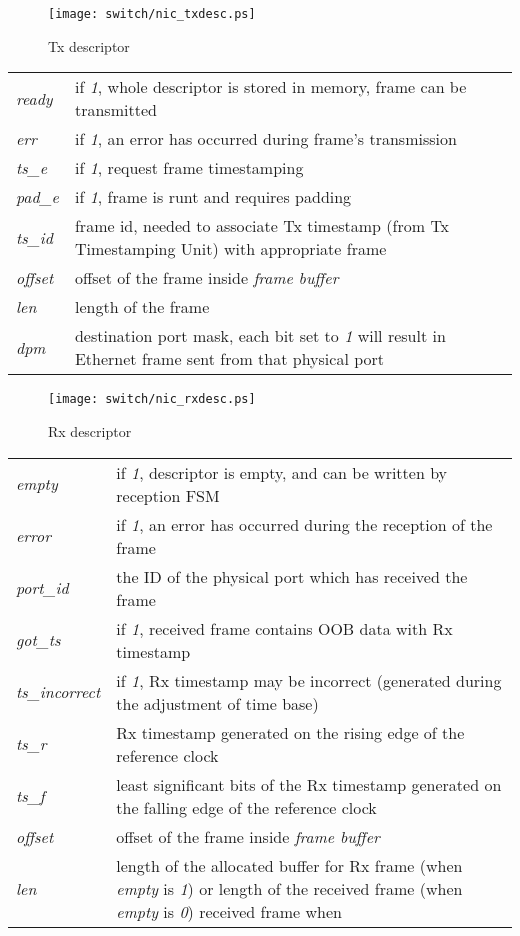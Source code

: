 \begin{figure}[ht]
  \begin{center}
    \texttt{[image: switch/nic\_txdesc.ps]}
    \caption{Tx descriptor}
    \label{fig:nic:tx_desc}
  \end{center}
\end{figure}
\newpage
\begin{tabular}{l p{12cm}}
  \emph{ready} & if \emph{1}, whole descriptor is stored in memory, frame can be
  transmitted\\
  \emph{err} & if \emph{1}, an error has occurred during frame's
    transmission\\
  \emph{ts\_e} & if \emph{1}, request frame timestamping\\
  \emph{pad\_e} & if \emph{1}, frame is runt and requires padding\\
  \emph{ts\_id} & frame id, needed to associate Tx timestamp (from Tx
    Timestamping Unit) with appropriate frame\\
  \emph{offset} & offset of the frame inside \emph{frame buffer}\\
  \emph{len} & length of the frame\\
  \emph{dpm} & destination port mask, each bit set to \emph{1} will
    result in Ethernet frame sent from that physical port\\
\end{tabular}


\begin{figure}[ht]
  \begin{center}
    \texttt{[image: switch/nic\_rxdesc.ps]}
    \caption{Rx descriptor}
    \label{fig:nic:rx_desc}
  \end{center}
\end{figure}
\begin{tabular}{l p{12cm}}
  \emph{empty} & if \emph{1}, descriptor is empty, and can be written by
  reception FSM\\
  \emph{error} & if \emph{1}, an error has occurred during the reception of the
  frame\\
  \emph{port\_id} & the ID of the physical port which has received the frame\\
  \emph{got\_ts} & if \emph{1}, received frame contains OOB data with Rx
  timestamp\\
  \emph{ts\_incorrect} & if \emph{1}, Rx timestamp may be incorrect (generated
  during the adjustment of time base)\\
  \emph{ts\_r} & Rx timestamp generated on the rising edge of the reference
  clock\\
  \emph{ts\_f} & least significant bits of the Rx timestamp generated on the
  falling edge of the reference clock\\
  \emph{offset} & offset of the frame inside \emph{frame buffer}\\
  \emph{len} & length of the allocated buffer for Rx frame (when \emph{empty}
  is \emph{1}) or length of the received frame (when \emph{empty} is \emph{0})
  received frame when
\end{tabular}

